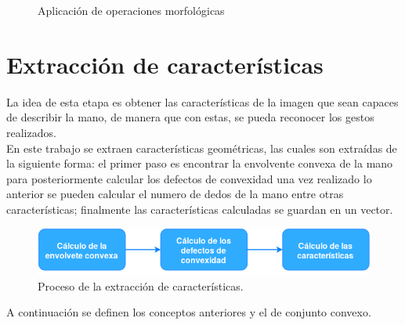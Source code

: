 \begin{figure}[h!]
\caption{Aplicación de operaciones morfológicas \citep{Smith1999} \label{fig:OM}}
\end{figure} 



\section{Extracción de características}\label{sec:Convexhull} 

La idea de esta etapa es obtener las características de la imagen que sean capaces de describir la mano, de manera que con estas, se pueda reconocer los gestos realizados.\\     
En este trabajo se extraen características geométricas, las cuales son extraídas de la siguiente forma: el primer paso es encontrar la envolvente convexa de la mano para posteriormente calcular los defectos de convexidad una vez realizado lo anterior se pueden calcular el numero de dedos de la mano entre otras características; finalmente las características calculadas  se guardan en un vector.  

\begin{figure}[h!]
\begin{center}
\includegraphics[scale=.7]{./Figures/DExtraccion.png}
\end{center}
\caption{Proceso de la extracción de características.}
\label{fig:DiagramaExtraccionCaracteristicas}
\end{figure} 

A continuación se definen los conceptos anteriores y el de conjunto convexo.

